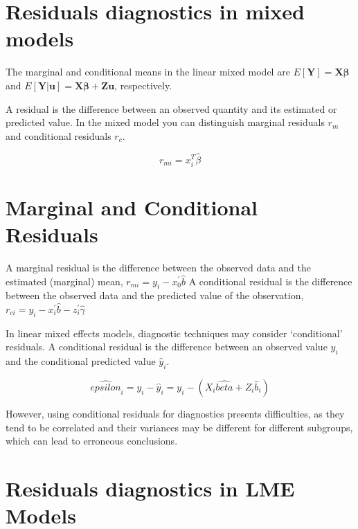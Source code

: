 \documentclass[12pt, a4paper]{report}
\theoremstyle{plain}
\theoremstyle{definition}
\theoremstyle{remark}
\begin{document}
	
	\section{Residuals diagnostics in mixed models}
	
	The marginal and conditional means in the linear mixed model are
	$E[\boldsymbol{Y}] = \boldsymbol{X}\boldsymbol{\beta}$ and
	$E[\boldsymbol{Y|\boldsymbol{u}}] = \boldsymbol{X}\boldsymbol{\beta} + \boldsymbol{Z}\boldsymbol{u}$, respectively.
	
	A residual is the difference between an observed quantity and its estimated or predicted value. In the mixed
	model you can distinguish marginal residuals $r_m$ and conditional residuals $r_c$. 
	
	\begin{equation}
	r_{mi}=x^{T}_{i}\hat{\beta}
	\end{equation}
	
	
	\section{Marginal and Conditional Residuals}
	
	A marginal residual is the difference between the observed data and the estimated (marginal) mean, $r_{mi} = y_i - x_0^{\prime} \hat{b}$
	A conditional residual is the difference between the observed data and the predicted value of the observation,
	$r_{ci} = y_i - x_i^{\prime} \hat{b} - z_i^{\prime} \hat{\gamma}$
	
	In linear mixed effects models, diagnostic techniques may consider `conditional' residuals. A conditional residual is the difference between an observed value $y_{i}$ and the conditional predicted value $\hat{y}_{i} $.
	
	\[ \hat{epsilon}_{i} = y_{i} - \hat{y}_{i} = y_{i} - ( X_{i}\hat{beta} + Z_{i}\hat{b}_{i}) \]
	
	However, using conditional residuals for diagnostics presents difficulties, as they tend to be correlated and their variances may be different for different subgroups, which can lead to erroneous conclusions.
	
	
	
	
	
	\section{Residuals diagnostics in LME Models}
	
\end{document}
